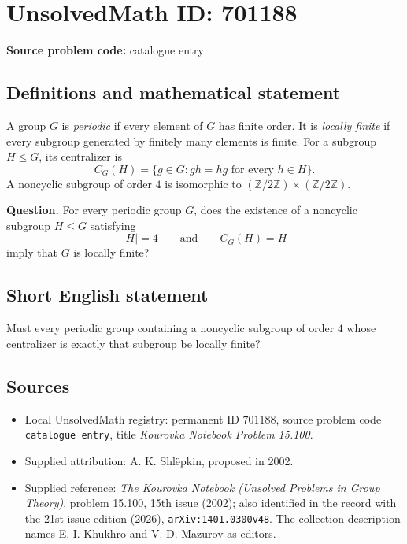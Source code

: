 \documentclass[11pt]{article}
\newcommand{\Z}{\mathbb{Z}}
\begin{document}
\section*{UnsolvedMath ID: 701188}
\textbf{Source problem code:} catalogue entry
\subsection{Definitions and mathematical statement}
A group \(G\) is \emph{periodic} if every element of \(G\) has finite order. It is \emph{locally finite} if every subgroup generated by finitely many elements is finite. For a subgroup \(H\leq G\), its centralizer is
\[
C_G(H)=\{g\in G: gh=hg\text{ for every }h\in H\}.
\]
A noncyclic subgroup of order \(4\) is isomorphic to \((\Z/2\Z)\times(\Z/2\Z)\).

\textbf{Question.} For every periodic group \(G\), does the existence of a noncyclic subgroup \(H\leq G\) satisfying
\[
|H|=4\qquad\text{and}\qquad C_G(H)=H
\]
imply that \(G\) is locally finite?
\subsection{Short English statement}
Must every periodic group containing a noncyclic subgroup of order \(4\) whose centralizer is exactly that subgroup be locally finite?
\subsection{Sources}
\begin{itemize}
\item Local UnsolvedMath registry: permanent ID \(701188\), source problem code \texttt{catalogue entry}, title \emph{Kourovka Notebook Problem 15.100}.
\item Supplied attribution: A. K. Shl\"epkin, proposed in 2002.
\item Supplied reference: \emph{The Kourovka Notebook (Unsolved Problems in Group Theory)}, problem 15.100, 15th issue (2002); also identified in the record with the 21st issue edition (2026), \texttt{arXiv:1401.0300v48}. The collection description names E. I. Khukhro and V. D. Mazurov as editors.
\end{itemize}
\end{document}
